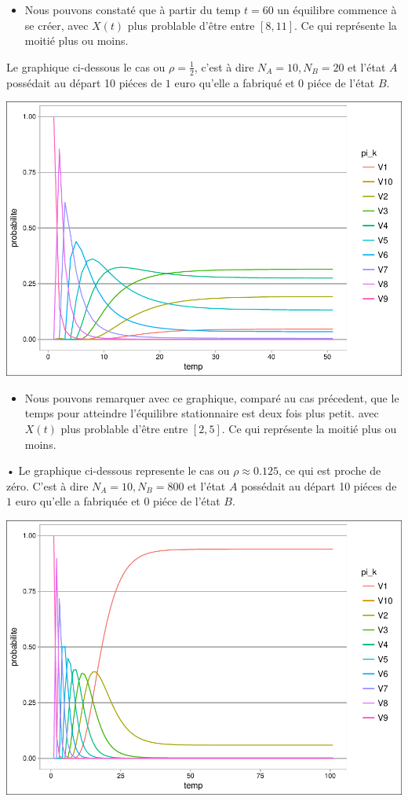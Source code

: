 \documentclass[11pt,]{article}
\providecommand{\tightlist}{%
  \setlength{\itemsep}{0pt}\setlength{\parskip}{0pt}}
\begin{document}
\begin{itemize}
\tightlist
\item
  Nous pouvons constaté que à partir du temp \(t=60\) un équilibre
  commence à se créer, avec \(X(t)\) plus problable d'être entre
  \([8,11]\). Ce qui représente la moitié plus ou moins.
\end{itemize}

Le graphique ci-dessous le cas ou \(\rho=\frac{1}{2}\), c'est à dire
\(N_A=10,N_B=20\) et l'état \(A\) possédait au départ 10 piéces de \(1\)
euro qu'elle a fabriqué et 0 piéce de l'état \(B\).

\includegraphics{money_exchange_files/figure-latex/unnamed-chunk-4-1.pdf}

\begin{itemize}
\tightlist
\item
  Nous pouvons remarquer avec ce graphique, comparé au cas précedent,
  que le temps pour atteindre l'équilibre stationnaire est deux fois
  plus petit. avec \(X(t)\) plus problable d'être entre \([2,5]\). Ce
  qui représente la moitié plus ou moins.
\end{itemize}

• Le graphique ci-dessous represente le cas ou \(\rho\approx 0.125\), ce
qui est proche de zéro. C'est à dire \(N_A=10,N_B=800\) et l'état \(A\)
possédait au départ 10 piéces de \(1\) euro qu'elle a fabriquée et 0
piéce de l'état \(B\).

\includegraphics{money_exchange_files/figure-latex/unnamed-chunk-5-1.pdf}
\end{document}
